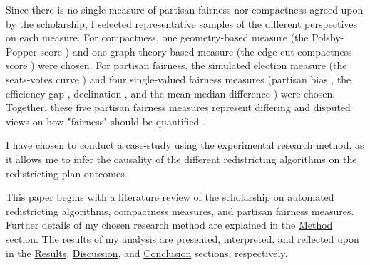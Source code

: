 Since there is no single measure of partisan fairness nor compactness agreed upon by the scholarship, I selected representative samples of the different perspectives on each measure. For compactness, one geometry-based measure (the Polsby-Popper score \parencite{polsby1991}) and one graph-theory-based measure (the edge-cut compactness score \parencite{dube2016}) were chosen. For partisan fairness, the simulated election measure (the seats-votes curve \parencite{tufte1973}) and four single-valued fairness measures (partisan bias \parencite{katz2020}, the efficiency gap \parencite{stephanopoulos2014}, declination \parencite{warrington2018}, and the mean-median difference \parencite{mcdonald2015}) were chosen. Together, these five partisan fairness measures represent differing and disputed views on how "fairness" should be quantified \parencite{katz2020}. 

I have chosen to conduct a case-study using the experimental research method, as it allows me to infer the causality of the different redistricting algorithms on the redistricting plan outcomes. 

This paper begins with a \hyperref[sec:litreview]{literature review} of the scholarship on automated redistricting algorithms, compactness measures, and partisan fairness measures. Further details of my chosen research method are explained in the \hyperref[sec:method]{Method} section. The results of my analysis are presented, interpreted, and reflected upon in the \hyperref[sec:results]{Results}, \hyperref[sec:disc]{Discussion}, and \hyperref[sec:conc]{Conclusion} sections, respectively. 